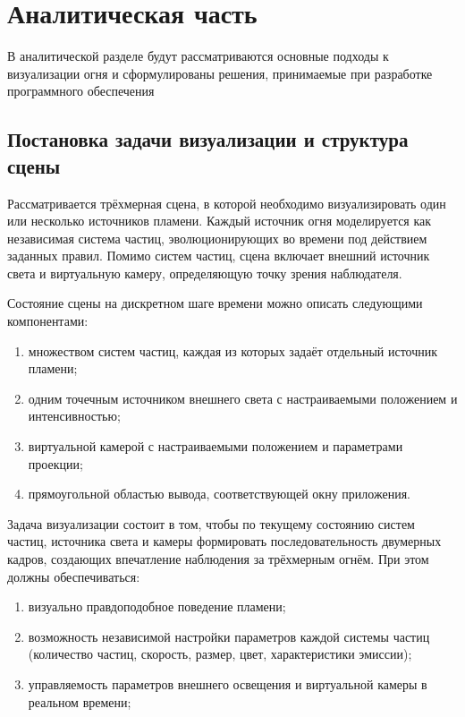 \chapter{Аналитическая часть}

В аналитической разделе будут рассматриваются основные подходы к визуализации огня и сформулированы решения, принимаемые при разработке программного обеспечения

\section{Постановка задачи визуализации и структура сцены}

Рассматривается трёхмерная сцена, в которой необходимо визуализировать один или несколько источников пламени. Каждый источник огня моделируется как независимая система частиц, эволюционирующих во времени под действием заданных правил. Помимо систем частиц, сцена включает внешний источник света и виртуальную камеру, определяющую точку зрения наблюдателя.

Состояние сцены на дискретном шаге времени можно описать следующими компонентами:
\begin{enumerate}
	\item множеством систем частиц, каждая из которых задаёт отдельный источник пламени;
	\item одним точечным источником внешнего света с настраиваемыми положением и интенсивностью;
	\item виртуальной камерой с настраиваемыми положением и параметрами проекции;
	\item прямоугольной областью вывода, соответствующей окну приложения.
\end{enumerate}

Задача визуализации состоит в том, чтобы по текущему состоянию систем частиц, источника света и камеры формировать последовательность двумерных кадров, создающих впечатление наблюдения за трёхмерным огнём. При этом должны обеспечиваться:
\begin{enumerate}
	\item визуально правдоподобное поведение пламени;
	\item возможность независимой настройки параметров каждой системы частиц (количество частиц, скорость, размер, цвет, характеристики эмиссии);
	\item управляемость параметров внешнего освещения и виртуальной камеры в реальном времени;
\end{enumerate}

